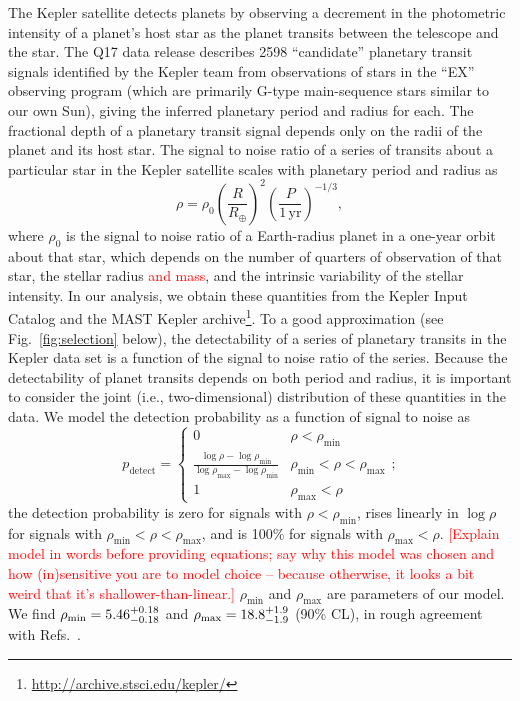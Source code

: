 \documentclass{nature}
\newcommand{\REarth}{R_\oplus}
\newcommand{\rhomin}{\rho_\mathrm{min}}
\newcommand{\rhomax}{\rho_\mathrm{max}}
\newcommand{\ilya}[1]{\textcolor{red}{#1}}
\begin{document}
The Kepler satellite detects planets by observing a decrement in the
photometric intensity of a planet's host star as the planet transits
between the telescope and the star.  The Q17 data release describes
2598 ``candidate'' planetary transit signals identified by the Kepler
team from observations of stars in the ``EX'' observing program (which
are primarily G-type main-sequence stars similar to our own
Sun\cite{Batalha2010}), giving the inferred planetary period and
radius for each.  The fractional depth of a planetary transit signal
depends only on the radii of the planet and its host star.  The signal
to noise ratio of a series of transits about a particular star in the
Kepler satellite scales with planetary period and radius
as\cite{Chatterjee2012}
\begin{equation}
  \rho = \rho_0 \left( \frac{R}{\REarth} \right)^2 \left(
  \frac{P}{1\,\mathrm{yr}} \right)^{-1/3},
\end{equation}
where $\rho_0$ is the signal to noise ratio of a Earth-radius planet
in a one-year orbit about that star, which depends on the number of
quarters of observation of that star, the stellar radius \ilya{and mass}, and the
intrinsic variability of the stellar intensity\cite{Christiansen2012}.  In our analysis, we obtain these
quantities from the Kepler Input Catalog\cite{Batalha2010,Brown2011}
and the MAST Kepler
archive\footnote{\url{http://archive.stsci.edu/kepler/}}.  To a good
approximation (see Fig.\ \ref{fig:selection} below), the detectability
of a series of planetary transits in the Kepler data set is a function
of the signal to noise ratio of the series.  Because the detectability
of planet transits depends on both period and radius, it is important
to consider the joint (i.e., two-dimensional) distribution of these
quantities in the data\cite{Tabachnik2002,Youdin2011}.  We model the
detection probability as a function of signal to noise as 
\begin{equation}
  \label{eq:pdetect}
  p_\mathrm{detect} = \begin{cases}
    0 & \rho < \rhomin \\
    \frac{\log \rho - \log \rhomin}{\log \rhomax - \log \rhomin} &
    \rhomin < \rho < \rhomax \\
    1 & \rhomax < \rho
  \end{cases};
\end{equation}
the detection probability is zero for signals with $\rho < \rhomin$,
rises linearly in $\log \rho$ for signals with $\rhomin < \rho <
\rhomax$, and is 100\% for signals with $\rhomax < \rho$. \ilya{[Explain model in words before providing equations; say why this model was chosen and how (in)sensitive you are to model choice -- because otherwise, it looks a bit weird that it's shallower-than-linear.]}  $\rhomin$
and $\rhomax$ are parameters of our model.  We find $\rhomin =
\rhominrange$ and $\rhomax = \rhomaxrange$ (90\% CL), in rough
agreement with Refs.\ \cite{Borucki2011,Batalha2013}.
\end{document}
